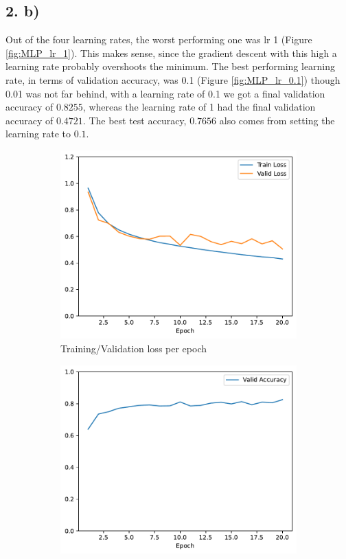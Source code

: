 \documentclass[11pt]{article}
\begin{document}
\subsection{2. b)}
Out of the four learning rates, the worst performing one was lr 1 (Figure \ref{fig:MLP_lr_1}). This makes sense, since the gradient descent with this high a learning rate probably overshoots the minimum.
The best performing learning rate, in terms of validation accuracy, was 0.1 (Figure \ref{fig:MLP_lr_0.1}) though 0.01 was not far behind, with a learning rate of 0.1 we got a final validation accuracy of $0.8255$, whereas the learning rate of 1 had the final validation accuracy of $0.4721$. The best test accuracy, $0.7656$ also comes from setting the learning rate to $0.1$.

\begin{figure}[h!]
\centering
\begin{subfigure}{.5\textwidth}
  \centering
  \includegraphics[width=.9\linewidth]{plots/mlp-training-loss-batch-16-lr-0.1-epochs-20-hidden-200-dropout-0.0-l2-0.0-layers-2-act-relu-opt-sgd}
  \caption{Training/Validation loss per epoch}
\end{subfigure}%
\begin{subfigure}{.5\textwidth}
  \centering
  \includegraphics[width=.9\linewidth]{plots/mlp-validation-accuracy-batch-16-lr-0.1-epochs-20-hidden-200-dropout-0.0-l2-0.0-layers-2-act-relu-opt-sgd}

\end{subfigure}
\end{figure}
\end{document}
